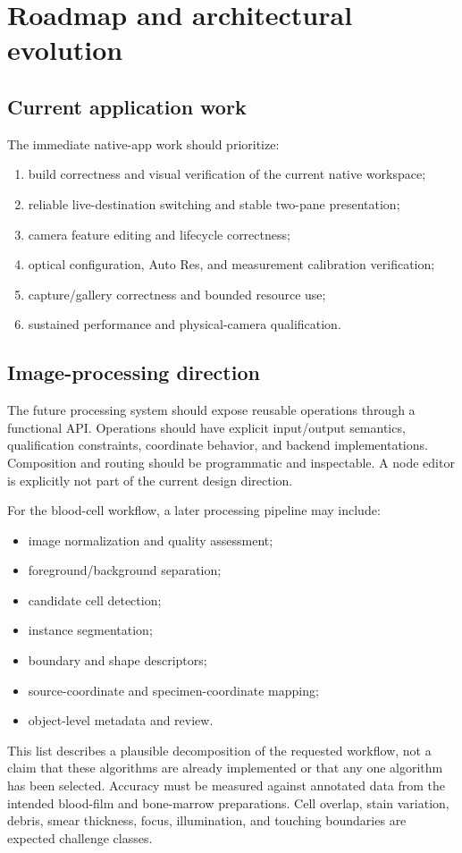 \documentclass[11pt,a4paper,oneside]{article}
\begin{document}
\section{Roadmap and architectural evolution}

\subsection{Current application work}
The immediate native-app work should prioritize:
\begin{enumerate}
  \item build correctness and visual verification of the current native workspace;
  \item reliable live-destination switching and stable two-pane presentation;
  \item camera feature editing and lifecycle correctness;
  \item optical configuration, Auto Res, and measurement calibration verification;
  \item capture/gallery correctness and bounded resource use;
  \item sustained performance and physical-camera qualification.
\end{enumerate}

\subsection{Image-processing direction}
The future processing system should expose reusable operations through a functional API. Operations should have explicit input/output semantics, qualification constraints, coordinate behavior, and backend implementations. Composition and routing should be programmatic and inspectable. A node editor is explicitly not part of the current design direction.

For the blood-cell workflow, a later processing pipeline may include:
\begin{itemize}
  \item image normalization and quality assessment;
  \item foreground/background separation;
  \item candidate cell detection;
  \item instance segmentation;
  \item boundary and shape descriptors;
  \item source-coordinate and specimen-coordinate mapping;
  \item object-level metadata and review.
\end{itemize}
This list describes a plausible decomposition of the requested workflow, not a claim that these algorithms are already implemented or that any one algorithm has been selected. Accuracy must be measured against annotated data from the intended blood-film and bone-marrow preparations. Cell overlap, stain variation, debris, smear thickness, focus, illumination, and touching boundaries are expected challenge classes.
\end{document}
